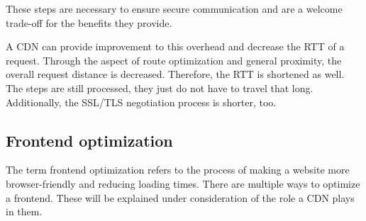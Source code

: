 These steps are necessary to ensure secure communication and are a welcome trade-off for the benefits they provide. 

A CDN can provide improvement to this overhead and decrease the RTT of a request. Through the aspect of route optimization and general proximity, the overall request distance is decreased. Therefore, the RTT is shortened as well. The steps are still processed, they just do not have to travel that long. Additionally, the SSL/TLS negotiation process is shorter, too.\cite{cdn_ssl_tsl}

\subsection{Frontend optimization}

The term frontend optimization refers to the process of making a website more browser-friendly and reducing loading times. There are multiple ways to optimize a frontend. These will be explained under consideration of the role a CDN plays in them.

